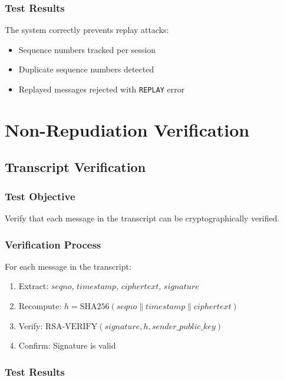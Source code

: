 \documentclass[runningheads]{llncs}
\begin{document}
\subsubsection{Test Results}

The system correctly prevents replay attacks:
\begin{itemize}
    \item Sequence numbers tracked per session
    \item Duplicate sequence numbers detected
    \item Replayed messages rejected with \texttt{REPLAY} error
\end{itemize}

\section{Non-Repudiation Verification}

\subsection{Transcript Verification}

\subsubsection{Test Objective}

Verify that each message in the transcript can be cryptographically verified.

\subsubsection{Verification Process}

For each message in the transcript:
\begin{enumerate}
    \item Extract: $seqno$, $timestamp$, $ciphertext$, $signature$
    \item Recompute: $h = \text{SHA256}(seqno \| timestamp \| ciphertext)$
    \item Verify: $\text{RSA-VERIFY}(signature, h, sender\_public\_key)$
    \item Confirm: Signature is valid
\end{enumerate}

\subsubsection{Test Results}
\end{document}

